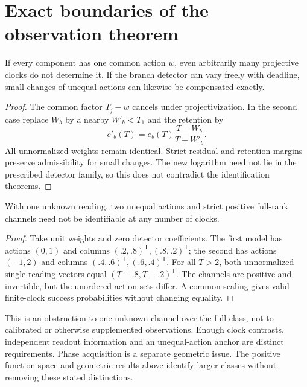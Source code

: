 \section{Exact boundaries of the observation theorem}
\label{sec:v83-boundaries}
\begin{proposition}
\label{prop:v83-obstructions}
If every component has one common action $w$, even arbitrarily many
projective clocks do not determine it. If the branch detector can vary
freely with deadline, small changes of unequal actions can likewise be
compensated exactly.
\end{proposition}
\begin{proof}
The common factor $T_j-w$ cancels under projectivization. In the second
case replace $W_b$ by a nearby $W'_b<T_1$ and the retention by
\[
 e'_b(T)=e_b(T)\frac{T-W_b}{T-W'_b}.
\]
All unnormalized weights remain identical. Strict residual and
retention margins preserve admissibility for small changes. The new
logarithm need not lie in the prescribed detector family, so this
does not contradict the identification theorems.
\end{proof}
\begin{proposition}
\label{prop:v83-one-view}
With one unknown reading, two unequal actions and strict positive
full-rank channels need not be identifiable at any number of clocks.
\end{proposition}
\begin{proof}
Take unit weights and zero detector coefficients. The first model has
actions $(0,1)$ and columns $(.2,.8)^{\mathsf T},(.8,.2)^{\mathsf T}$;
the second has actions $(-1,2)$ and columns
$(.4,.6)^{\mathsf T},(.6,.4)^{\mathsf T}$. For all $T>2$, both
unnormalized single-reading vectors equal
$(T-.8,T-.2)^{\mathsf T}$. The channels are positive and invertible,
but the unordered action sets differ. A common scaling gives valid
finite-clock success probabilities without changing equality.
\end{proof}
This is an obstruction to one unknown channel over the full class,
not to calibrated or otherwise supplemented observations. Enough clock
contrasts, independent readout information and an unequal-action anchor
are distinct requirements. Phase acquisition is a separate geometric
issue. The positive function-space and geometric results above identify
larger classes without removing these stated distinctions.
